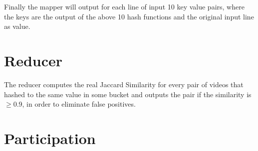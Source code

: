 \documentclass[a4paper, 11pt]{article}
\begin{document}
Finally the mapper will output for each line of input 10 key value pairs, where
the keys are the output of the above 10 hash functions and the original input line
as value.

\section{Reducer}

The reducer computes the real Jaccard Similarity for every pair of videos that
hashed to the same value in some bucket and outputs the pair if the similarity
is $\ge 0.9$, in order to eliminate false positives. 

\section{Participation}
\end{document}
